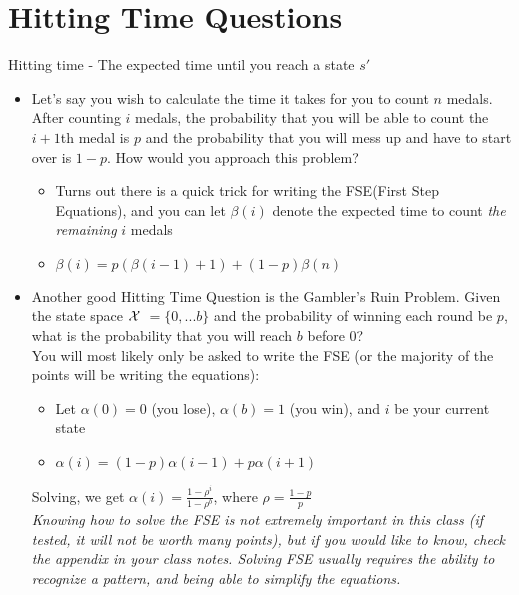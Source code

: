 \documentclass[a4paper]{article}
\begin{document}
\section{Hitting Time Questions}
Hitting time - The expected time until you reach a state $s'$
\begin{itemize}
        \item Let's say you wish to calculate the time it takes for you to count $n$ medals. After counting $i$ medals, the probability that you will be able to count the $i+1$th medal is $p$ and the probability that you will mess up and have to start over is $1-p$. How would you approach this problem?
        \begin{itemize}
            \item Turns out there is a quick trick for writing the FSE(First Step Equations), and you can let $\beta (i)$ denote the expected time to count \textit{the remaining} $i$ medals
            \item $\beta (i) = p (\beta (i - 1) + 1) + (1-p)\beta (n)$ 
        \end{itemize}
        \item Another good Hitting Time Question is the Gambler's Ruin Problem. Given the state space $\cal X$ $= \{0,...b\}$ and the probability of winning each round be $p$, what is the probability that you will reach $b$ before 0?\\
        You will most likely only be asked to write the FSE (or the majority of the points will be writing the equations):
        \begin{itemize}
            \item Let $\alpha(0) = 0$ (you lose), $\alpha(b) = 1$ (you win), and $i$ be your current state
            \item $\alpha(i) = (1-p)\alpha(i-1) + p\alpha(i+1)$
        \end{itemize}
        Solving, we get $\alpha(i) = \frac{1 - \rho^i}{1- \rho^b}$, where $\rho = \frac{1-p}{p}$ \\
        \textit{ Knowing how to solve the FSE is not extremely important in this class (if tested, it will not be worth many points), but if you would like to know, check the appendix in your class notes. Solving FSE usually requires the ability to recognize a pattern, and being able to simplify the equations.}
\end{itemize}
\end{document}
